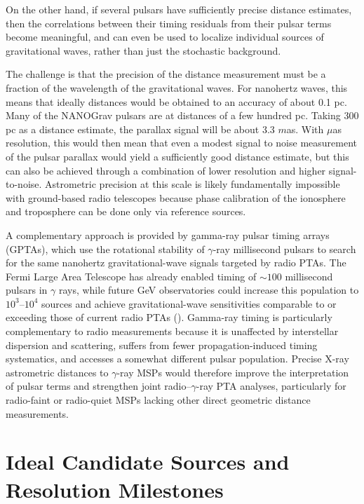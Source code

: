 \documentclass{article}
\begin{document}
On the other hand, if several pulsars have sufficiently precise distance estimates, then the correlations between their timing residuals from their pulsar terms become meaningful, and can even be used to localize individual sources of gravitational waves, rather than just the stochastic background\cite{2011MNRAS.414.3251L}.

The challenge is that the precision of the distance measurement must be a fraction of the wavelength of the gravitational waves. For nanohertz waves, this means that ideally distances would be obtained to an accuracy of about 0.1 pc. Many of the NANOGrav pulsars are at distances of a few hundred pc. Taking 300 pc as a distance estimate, the parallax signal will be about 3.3 $m$as. With $\mu$as resolution, this would then mean that even a modest signal to noise measurement of the pulsar parallax would yield a sufficiently good distance estimate, but this can also be achieved through a combination of lower resolution and higher signal-to-noise. Astrometric precision at this scale is likely fundamentally impossible with ground-based radio telescopes because phase calibration of the ionosphere and troposphere can be done only via reference sources.

A complementary approach is provided by gamma-ray pulsar timing arrays (GPTAs), which use the rotational stability of $\gamma$-ray millisecond pulsars to search for the same nanohertz gravitational-wave signals targeted by radio PTAs.  The Fermi Large Area Telescope has already enabled timing of $\sim100$ millisecond pulsars in $\gamma$ rays, while future GeV observatories could increase this population to $10^3$--$10^4$ sources and achieve gravitational-wave sensitivities comparable to or exceeding those of current radio PTAs (\citealt{2026ApJ..1001L..36K}).  Gamma-ray timing is particularly complementary to radio measurements because it is unaffected by interstellar dispersion and scattering, suffers from fewer propagation-induced timing systematics, and accesses a somewhat different pulsar population.  Precise X-ray astrometric distances to $\gamma$-ray MSPs would therefore improve the interpretation of pulsar terms and strengthen joint radio--$\gamma$-ray PTA analyses, particularly for radio-faint or radio-quiet MSPs lacking other direct geometric distance measurements.



\section{Ideal Candidate Sources and Resolution Milestones}
\end{document}
